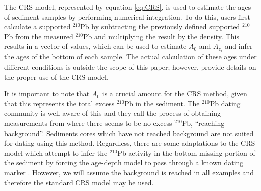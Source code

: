 \documentclass [10pt] {article}
\newcommand{\ac}{\color{red} }  %
\newcommand{\ca}{\color{black}} %
\begin{document}
The CRS model, represented by equation \ref{eq:CRS}, is used to estimate the ages of sediment samples by performing numerical integration. To do this, users first calculate a supported $^{210}$Pb by subtracting the previously defined supported $^{210}$Pb from the measured $^{210}$Pb and multiplying the result by the density. This results in a vector of values, which can be used to estimate $A_0$ and $A_{z_i}$ and infer the ages of the bottom of each sample. The actual calculation of these ages under different conditions is outside the scope of this paper; however, \citet{Sanchez-Cabeza2012} provide details on the proper use of the CRS model.


It is important to note that $A_0$ is a crucial amount  for the CRS method, given that this represents the total excess $^{210}$Pb in the sediment. The $^{210}$Pb dating community is well aware of this and they call the process of obtaining measurements from where there seems to be no excess $^{210}$Pb, ``reaching background''. Sediments cores which have not reached background are not suited for dating using this method. Regardless, there are some adaptations to the CRS model which attempt to infer the $^{210}$Pb activity in the bottom missing portion of the sediment by forcing the age-depth model to pass through a known dating marker \citep[a depth which age is known from other methods][]{Sanchez-Cabeza2012}. However, we will assume the background is reached in all examples and therefore the standard CRS model may be used.



\end{document}
